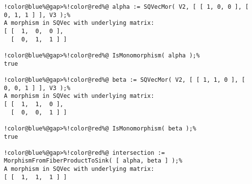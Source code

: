 \begin{Verbatim}[commandchars=!@\%,frame=single]
!color@blue%@gap>%!color@red%@ alpha := SQVecMor( V2, [ [ 1, 0, 0 ], [ 0, 1, 1 ] ], V3 );%
A morphism in SQVec with underlying matrix:
[ [  1,  0,  0 ],
  [  0,  1,  1 ] ]

!color@blue%@gap>%!color@red%@ IsMonomorphism( alpha );%
true

!color@blue%@gap>%!color@red%@ beta := SQVecMor( V2, [ [ 1, 1, 0 ], [ 0, 0, 1 ] ], V3 );%
A morphism in SQVec with underlying matrix:
[ [  1,  1,  0 ],
  [  0,  0,  1 ] ]

!color@blue%@gap>%!color@red%@ IsMonomorphism( beta );%
true

!color@blue%@gap>%!color@red%@ intersection := MorphismFromFiberProductToSink( [ alpha, beta ] );%
A morphism in SQVec with underlying matrix:
[ [  1,  1,  1 ] ]

\end{Verbatim}
